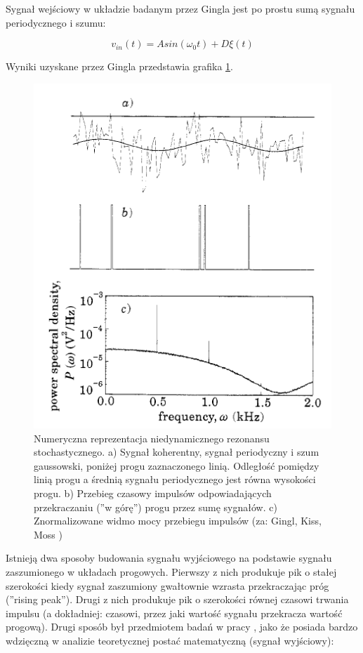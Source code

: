   Sygnał wejściowy w układzie badanym przez Gingla \cite{gingl_kiss_moss} jest po prostu sumą sygnału periodycznego i szumu:

  \begin{equation} \label{sr:gingl}
    v_{in}(t) = A sin (\omega_0 t) + D \xi(t)
  \end{equation}
  
  Wyniki uzyskane przez Gingla przedstawia grafika \ref{fig:graphics:gingl}. 

  \begin{figure}
    \includegraphics[scale=0.8]{images/gingl_1.png}
    \caption{Numeryczna reprezentacja niedynamicznego rezonansu stochastycznego. a) Sygnał koherentny, sygnał periodyczny i szum gaussowski, poniżej progu zaznaczonego linią. Odległość pomiędzy linią progu a średnią sygnału periodycznego jest równa wysokości progu. b) Przebieg czasowy impulsów odpowiadających przekraczaniu (''w górę'') progu przez sumę sygnałów. c) Znormalizowane widmo mocy przebiegu impulsów (za: Gingl, Kiss, Moss \cite{gingl_kiss_moss} )}
    \label{fig:graphics:gingl}
  \end{figure}

  Istnieją dwa sposoby budowania sygnału wyjściowego na podstawie sygnału zaszumionego w układach progowych. Pierwszy z nich produkuje pik o stałej szerokości kiedy sygnał zaszumiony gwałtownie wzrasta przekraczając próg (''rising peak''). Drugi z nich produkuje pik o szerokości równej czasowi trwania impulsu (a dokładniej: czasowi, przez jaki wartość sygnału przekracza wartość progową). Drugi sposób był przedmiotem badań w pracy \cite{blondeau_e53}, jako że posiada bardzo wdzięczną w analizie teoretycznej postać matematyczną (sygnał wyjściowy):

